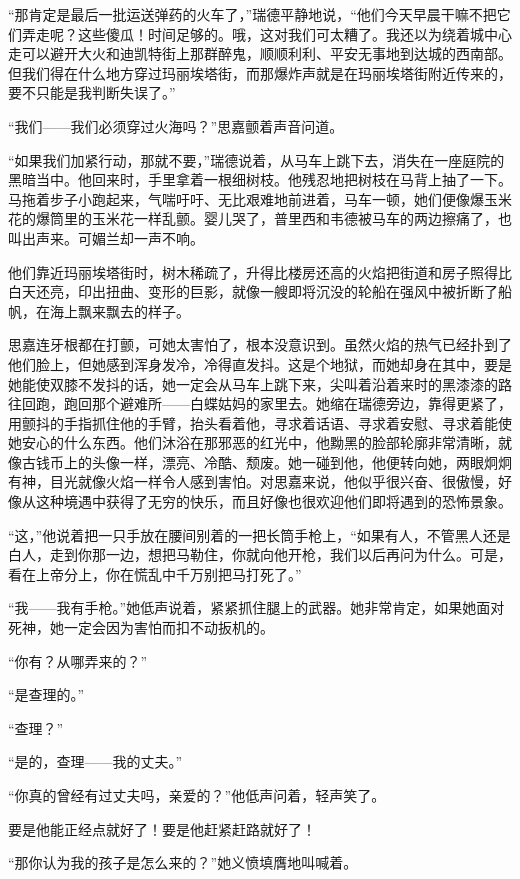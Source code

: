 \par “那肯定是最后一批运送弹药的火车了，”瑞德平静地说，“他们今天早晨干嘛不把它们弄走呢？这些傻瓜！时间足够的。哦，这对我们可太糟了。我还以为绕着城中心走可以避开大火和迪凯特街上那群醉鬼，顺顺利利、平安无事地到达城的西南部。但我们得在什么地方穿过玛丽埃塔街，而那爆炸声就是在玛丽埃塔街附近传来的，要不只能是我判断失误了。”
\par “我们——我们必须穿过火海吗？”思嘉颤着声音问道。
\par “如果我们加紧行动，那就不要，”瑞德说着，从马车上跳下去，消失在一座庭院的黑暗当中。他回来时，手里拿着一根细树枝。他残忍地把树枝在马背上抽了一下。马拖着步子小跑起来，气喘吁吁、无比艰难地前进着，马车一顿，她们便像爆玉米花的爆筒里的玉米花一样乱颤。婴儿哭了，普里西和韦德被马车的两边擦痛了，也叫出声来。可媚兰却一声不响。
\par 他们靠近玛丽埃塔街时，树木稀疏了，升得比楼房还高的火焰把街道和房子照得比白天还亮，印出扭曲、变形的巨影，就像一艘即将沉没的轮船在强风中被折断了船帆，在海上飘来飘去的样子。
\par 思嘉连牙根都在打颤，可她太害怕了，根本没意识到。虽然火焰的热气已经扑到了他们脸上，但她感到浑身发冷，冷得直发抖。这是个地狱，而她却身在其中，要是她能使双膝不发抖的话，她一定会从马车上跳下来，尖叫着沿着来时的黑漆漆的路往回跑，跑回那个避难所——白蝶姑妈的家里去。她缩在瑞德旁边，靠得更紧了，用颤抖的手指抓住他的手臂，抬头看着他，寻求着话语、寻求着安慰、寻求着能使她安心的什么东西。他们沐浴在那邪恶的红光中，他黝黑的脸部轮廓非常清晰，就像古钱币上的头像一样，漂亮、冷酷、颓废。她一碰到他，他便转向她，两眼炯炯有神，目光就像火焰一样令人感到害怕。对思嘉来说，他似乎很兴奋、很傲慢，好像从这种境遇中获得了无穷的快乐，而且好像也很欢迎他们即将遇到的恐怖景象。
\par “这，”他说着把一只手放在腰间别着的一把长筒手枪上，“如果有人，不管黑人还是白人，走到你那一边，想把马勒住，你就向他开枪，我们以后再问为什么。可是，看在上帝分上，你在慌乱中千万别把马打死了。”
\par “我——我有手枪。”她低声说着，紧紧抓住腿上的武器。她非常肯定，如果她面对死神，她一定会因为害怕而扣不动扳机的。
\par “你有？从哪弄来的？”
\par “是查理的。”
\par “查理？”
\par “是的，查理——我的丈夫。”
\par “你真的曾经有过丈夫吗，亲爱的？”他低声问着，轻声笑了。
\par 要是他能正经点就好了！要是他赶紧赶路就好了！
\par “那你认为我的孩子是怎么来的？”她义愤填膺地叫喊着。
